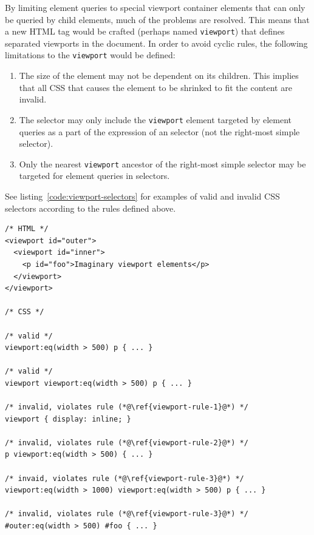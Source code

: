 \documentclass[a4paper,11pt]{kth-mag}
\newcommand{\code}[1]{\texttt{#1}}
\begin{document}
          By limiting element queries to special \gls{viewport} container \glspl{element} that can only be queried by child \glspl{element}, much of the problems are resolved.
          This means that a new \gls{HTML} tag would be crafted (perhaps named \code{viewport}) that defines separated \glspl{viewport} in the \gls{document}.
          In order to avoid cyclic rules, the following limitations to the \code{viewport} would be defined:
          \begin{enumerate}
            \item\label{viewport-rule-1} The size of the \gls{element} may not be dependent on its children. This implies that all \gls{CSS} that causes the \gls{element} to be shrinked to fit the content are invalid.
            \item\label{viewport-rule-2} The selector may only include the \code{viewport} \gls{element} targeted by element queries as a part of the expression of an selector (not the right-most simple selector).
            \item\label{viewport-rule-3} Only the nearest \code{viewport} ancestor of the right-most simple selector may be targeted for element queries in selectors.
          \end{enumerate}
          See listing~\ref{code:viewport-selectors} for examples of valid and invalid CSS selectors according to the rules defined above.
          \begin{lstlisting}[caption={Examples of valid and invalid selectors with the imaginary \code{viewport} element.}, captionpos=b, label={code:viewport-selectors}]
/* HTML */
<viewport id="outer">
  <viewport id="inner">
    <p id="foo">Imaginary viewport elements</p>
  </viewport>
</viewport>

/* CSS */

/* valid */
viewport:eq(width > 500) p { ... }

/* valid */
viewport viewport:eq(width > 500) p { ... }

/* invalid, violates rule (*@\ref{viewport-rule-1}@*) */
viewport { display: inline; }

/* invalid, violates rule (*@\ref{viewport-rule-2}@*) */
p viewport:eq(width > 500) { ... }

/* invaid, violates rule (*@\ref{viewport-rule-3}@*) */
viewport:eq(width > 1000) viewport:eq(width > 500) p { ... }

/* invalid, violates rule (*@\ref{viewport-rule-3}@*) */
#outer:eq(width > 500) #foo { ... }
          \end{lstlisting}
          
\end{document}
